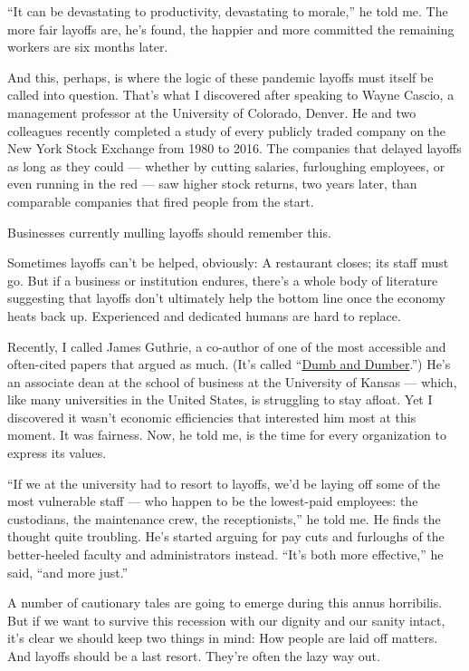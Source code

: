 ``It can be devastating to productivity, devastating to morale,'' he
told me. The more fair layoffs are, he's found, the happier and more
committed the remaining workers are six months later.

And this, perhaps, is where the logic of these pandemic layoffs must
itself be called into question. That's what I discovered after speaking
to Wayne Cascio, a management professor at the University of Colorado,
Denver. He and two colleagues recently completed a study of every
publicly traded company on the New York Stock Exchange from 1980 to
2016. The companies that delayed layoffs as long as they could ---
whether by cutting salaries, furloughing employees, or even running in
the red --- saw higher stock returns, two years later, than comparable
companies that fired people from the start.

Businesses currently mulling layoffs should remember this.

Sometimes layoffs can't be helped, obviously: A restaurant closes; its
staff must go. But if a business or institution endures, there's a whole
body of literature suggesting that layoffs don't ultimately help the
bottom line once the economy heats back up. Experienced and dedicated
humans are hard to replace.

Recently, I called James Guthrie, a co-author of one of the most
accessible and often-cited papers that argued as much. (It's called
``\href{https://econpapers.repec.org/article/inmororsc/v_3a19_3ay_3a2008_3ai_3a1_3ap_3a108-123.htm}{Dumb
and Dumber}.'') He's an associate dean at the school of business at the
University of Kansas --- which, like many universities in the United
States, is struggling to stay afloat. Yet I discovered it wasn't
economic efficiencies that interested him most at this moment. It was
fairness. Now, he told me, is the time for every organization to express
its values.

``If we at the university had to resort to layoffs, we'd be laying off
some of the most vulnerable staff --- who happen to be the lowest-paid
employees: the custodians, the maintenance crew, the receptionists,'' he
told me. He finds the thought quite troubling. He's started arguing for
pay cuts and furloughs of the better-heeled faculty and administrators
instead. ``It's both more effective,'' he said, ``and more just.''

A number of cautionary tales are going to emerge during this annus
horribilis. But if we want to survive this recession with our dignity
and our sanity intact, it's clear we should keep two things in mind: How
people are laid off matters. And layoffs should be a last resort.
They're often the lazy way out.

